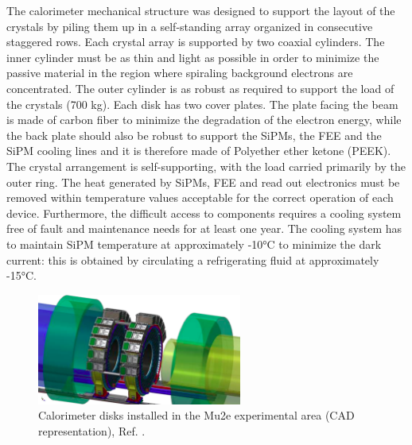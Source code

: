 The calorimeter mechanical structure was designed to support the layout of the crystals 
by piling them up in a self-standing array organized in consecutive staggered rows. 
Each crystal array is supported by two coaxial cylinders. The inner cylinder must be 
as thin and light as possible in order to minimize the passive material in the 
region where spiraling background electrons are concentrated. The outer cylinder 
is as robust as required to support the load of the crystals (700 kg). Each disk 
has two cover plates. The plate facing the beam is made of carbon fiber to minimize 
the degradation of the electron energy, while the back plate should also be robust 
to support the SiPMs, the FEE and the SiPM cooling lines and it 
is therefore made of Polyether ether ketone (PEEK). The crystal arrangement is 
self-supporting, with the load carried primarily by the outer ring. 
The heat generated by SiPMs, FEE and read out electronics 
must be removed within temperature values acceptable for the correct operation 
of each device. Furthermore, the difficult access to components requires a 
cooling system free of fault and maintenance needs for at least one year. 
The cooling system has to maintain SiPM temperature at approximately -10°C to 
minimize the dark current: this is obtained by circulating a refrigerating fluid at approximately  -15°C.


\begin{figure}[!h]
    \centering
    \includegraphics[width =0.6\textwidth]{figures/png/Screenshot_20240322_122050.png}
    \caption[CAD representation of the calorimeter disks.]{Calorimeter disks installed in the Mu2e experimental area (CAD representation), Ref. \cite{em7}.}
    \label{fig:calo1}
\end{figure}



